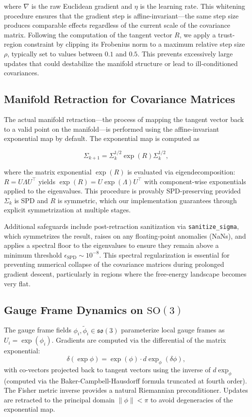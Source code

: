 \documentclass[twoside,11pt]{article}
\begin{document}
where $\nabla$ is the raw Euclidean gradient and $\eta$ is the learning rate. This whitening procedure ensures that the gradient step is affine-invariant—the same step size produces comparable effects regardless of the current scale of the covariance matrix. Following the computation of the tangent vector $R$, we apply a trust-region constraint by clipping its Frobenius norm to a maximum relative step size $\rho$, typically set to values between $0.1$ and $0.5$. This prevents excessively large updates that could destabilize the manifold structure or lead to ill-conditioned covariances.

\subsection{Manifold Retraction for Covariance Matrices}
The actual manifold retraction—the process of mapping the tangent vector back to a valid point on the manifold—is performed using the affine-invariant exponential map by default. The exponential map is computed as

\begin{equation}
\Sigma_{k+1} = \Sigma_k^{1/2} \exp(R) \Sigma_k^{1/2},
\end{equation}

where the matrix exponential $\exp(R)$ is evaluated via eigendecomposition: $R = U \Lambda U^\top$ yields $\exp(R) = U \exp(\Lambda) U^\top$ with component-wise exponentials applied to the eigenvalues. This procedure is provably SPD-preserving provided $\Sigma_k$ is SPD and $R$ is symmetric, which our implementation guarantees through explicit symmetrization at multiple stages.

Additional safeguards include post-retraction sanitization via
\texttt{sanitize\_sigma}, which symmetrizes the result, raises on any
floating-point anomalies (NaNs), and applies a spectral floor to the
eigenvalues to ensure they remain above a minimum threshold
$\epsilon_{\mathrm{SPD}}\!\sim\!10^{-8}$. This spectral regularization is
essential for preventing numerical collapse of the covariance matrices
during prolonged gradient descent, particularly in regions where the
free-energy landscape becomes very flat.

\subsection{Gauge Frame Dynamics on $\mathrm{SO}(3)$}
The gauge frame fields $\phi_i, \tilde{\phi}_i \in \mathfrak{so}(3)$ parameterize local gauge frames as $U_i = \exp(\phi_i)$. Gradients are computed via the differential of the matrix exponential:
\begin{equation}
\delta(\exp \phi) = \exp(\phi) \cdot d\exp_\phi(\delta \phi),
\end{equation}
with co-vectors projected back to tangent vectors using the inverse of $d\exp_\phi$ (computed via the Baker-Campbell-Hausdorff formula truncated at fourth order). The Fisher metric inverse provides a natural Riemannian preconditioner. Updates are retracted to the principal domain $\|\phi\| < \pi$ to avoid degeneracies of the exponential map.
\end{document}
